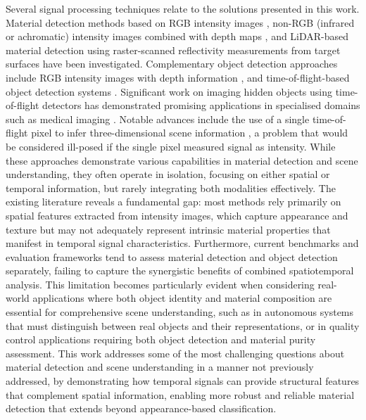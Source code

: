 \documentclass[12pt,a4paper,oneside]{report}
\begin{document}
Several signal processing techniques relate to the solutions presented in this work. Material detection methods based on RGB intensity images \cite{schwartz2013,sharan2013,depthpro2024}, non-RGB (infrared or achromatic) intensity images combined with depth maps \cite{sharma2023}, and LiDAR-based material detection using raster-scanned reflectivity measurements from target surfaces \cite{yang2024} have been investigated. Complementary object detection approaches include RGB intensity images with depth information \cite{chen2024}, and time-of-flight-based object detection systems \cite{tafone2023,fasolino2024,yang2023}. Significant work on imaging hidden objects using time-of-flight detectors has demonstrated promising applications in specialised domains such as medical imaging \cite{lyons2019}. Notable advances include the use of a single time-of-flight pixel to infer three-dimensional scene information \cite{turpin2019}, a problem that would be considered ill-posed if the single pixel measured signal as intensity. While these approaches demonstrate various capabilities in material detection and scene understanding, they often operate in isolation, focusing on either spatial or temporal information, but rarely integrating both modalities effectively. The existing literature reveals a fundamental gap: most methods rely primarily on spatial features extracted from intensity images, which capture appearance and texture but may not adequately represent intrinsic material properties that manifest in temporal signal characteristics. Furthermore, current benchmarks and evaluation frameworks tend to assess material detection and object detection separately, failing to capture the synergistic benefits of combined spatiotemporal analysis. This limitation becomes particularly evident when considering real-world applications where both object identity and material composition are essential for comprehensive scene understanding, such as in autonomous systems that must distinguish between real objects and their representations, or in quality control applications requiring both object detection and material purity assessment. This work addresses some of the most challenging questions about material detection and scene understanding in a manner not previously addressed, by demonstrating how temporal signals can provide structural features that complement spatial information, enabling more robust and reliable material detection that extends beyond appearance-based classification.
\end{document}
